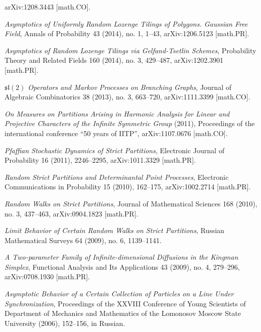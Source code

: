 \documentclass[letterpaper,11pt]{article}
\begin{document}
\begin{etaremune}
	      arXiv:1208.3443 [math.CO].
	\item
	      \emph{Asymptotics of Uniformly Random Lozenge Tilings of
		      Polygons. Gaussian Free Field},
	      Annals of Probability 43 (2014), no. 1, 1--43, arXiv:1206.5123
	      [math.PR].
	\item
	      \emph{Asymptotics of Random Lozenge Tilings via Gelfand-Tsetlin
		      Schemes},
	      Probability Theory and Related Fields 160 (2014), no. 3,
	      429--487, arXiv:1202.3901 [math.PR].
	\item
	      \emph{$\mathfrak{sl}(2)$
		      Operators and Markov Processes on Branching Graphs},
	      Journal of Algebraic Combinatorics 38 (2013), no. 3, 663--720,
	      arXiv:1111.3399 [math.CO].
	\item
	      \emph{On Measures on Partitions Arising in Harmonic Analysis for
		      Linear and Projective Characters of the Infinite Symmetric Group} (2011),
	      Proceedings of the international conference ``50 years of
	      IITP'', arXiv:1107.0676 [math.CO].
	\item
	      \emph{Pfaffian Stochastic Dynamics of Strict Partitions},
	      Electronic Journal of Probability 16 (2011), 2246--2295,
	      arXiv:1011.3329 [math.PR].
	\item
	      \emph{Random Strict Partitions and Determinantal Point
		      Processes},
	      Electronic Communications in Probability 15 (2010), 162--175,
	      arXiv:1002.2714 [math.PR].
	\item
	      \emph{Random Walks on Strict Partitions}, Journal of
	      Mathematical Sciences 168 (2010), no. 3, 437--463,
	      arXiv:0904.1823 [math.PR].
	\item
	      \emph{Limit Behavior of Certain Random Walks on Strict
		      Partitions},
	      Russian Mathematical Surveys 64 (2009), no. 6, 1139--1141.
	\item
	      \emph{A Two-parameter Family of Infinite-dimensional Diffusions
		      in the Kingman Simplex}, Functional Analysis and Its
	      Applications 43 (2009), no. 4, 279--296, arXiv:0708.1930
	      [math.PR].
	\item
	      \emph{Asymptotic Behavior of a Certain Collection of Particles
		      on a Line Under Synchronization}, Proceedings of the XXVIII
	      Conference of Young Scientists of Department of Mechanics and
	      Mathematics of the Lomonosov Moscow State University (2006), 152--156, in
	      Russian.
\end{etaremune}
\end{document}

